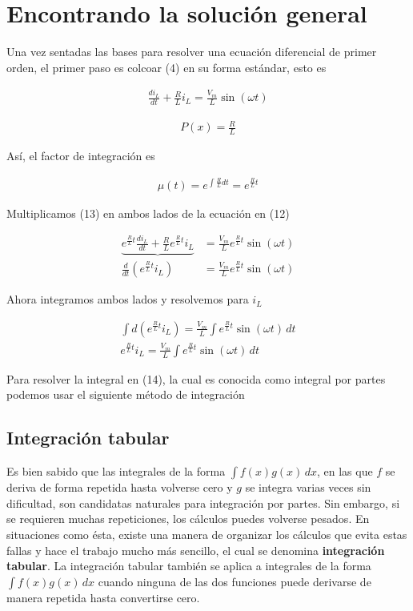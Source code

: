 \documentclass{article}
\begin{document}
\section*{Encontrando la solución general}
Una vez sentadas las bases para resolver una ecuación diferencial de primer orden, el primer paso es colcoar (4) en su forma estándar, esto es

\begin{align}
	\frac{di_L}{dt} + \frac{R}{L}i_L = \frac{V_m}{L}\sin(\omega t)
\end{align}

\noindent 
\begin{align}
	P(x) = \frac{R}{L} \nonumber
\end{align}

\noindent Así, el factor de integración es

\begin{align}
	\mu(t) = e^{\int \frac{R}{L} dt} = e^{\frac{R}{L}t}
\end{align}

\noindent Multiplicamos (13) en ambos lados de la ecuación en (12)

\begin{align}
	\underbrace{e^{\frac{R}{L}t} \frac{di_L}{dt} + \frac{R}{L}e^{\frac{R}{L}t}i_L} &= \frac{V_m}{L}e^{\frac{R}{L}t}\sin(\omega t) \nonumber \\
	\frac{d}{dt}(e^{\frac{R}{L}t} i_L) \quad &= \frac{V_m}{L}e^{\frac{R}{L}t}\sin(\omega t) \nonumber
\end{align}

\noindent Ahora integramos ambos lados y resolvemos para $i_L$

\begin{align}
	\int d(e^{\frac{R}{L}t} i_L) = \frac{V_m}{L} \int e^{\frac{R}{L}t}\sin(\omega t) \, dt  \nonumber \\
	e^{\frac{R}{L}t} i_L = \frac{V_m}{L} \int e^{\frac{R}{L}t}\sin(\omega t) \, dt
\end{align}

\noindent Para resolver la integral en (14), la cual es conocida como integral por partes podemos usar el siguiente método de integración

\subsection*{Integración tabular}
Es bien sabido que las integrales de la forma $\int f(x)g(x) \, dx$, en las que $f$ se deriva de forma repetida hasta volverse cero y $g$ se integra varias veces sin dificultad, son candidatas naturales para integración por partes. Sin embargo, si se requieren muchas repeticiones, los cálculos puedes volverse pesados. En situaciones como ésta, existe una manera de organizar los cálculos que evita estas fallas y hace el trabajo mucho más sencillo, el cual se denomina \textbf{integración tabular}. La integración tabular también se aplica a integrales de la forma  $\int f(x)g(x) \, dx$ cuando ninguna de las dos funciones puede derivarse de manera repetida hasta convertirse cero. \\
\end{document}
